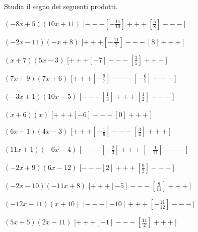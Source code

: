\begin{esercizio}\label{ese:dis_5}
 Studia il segno dei seguenti prodotti.
 \begin{enumeratea}
  \item  $\left(-8 x +5\right)\left(10 x +11\right)$ \hfill 
  [$---\left [-\frac{11}{10} \right ]+++\left [\frac{5}{8} \right ]---$]
  \item  $\left(-2 x -11\right)\left(- x +8\right)$ \hfill 
  [$+++\left [-\frac{11}{2} \right ]---\left [8 \right ]+++$]
  \item  $\left(x +7\right)\left(5 x -3\right)$ \hfill 
  [$+++\left [-7 \right ]---\left [\frac{3}{5} \right ]+++$]
  \item  $\left(7 x +9\right)\left(7 x +6\right)$ \hfill 
  [$+++\left [-\frac{9}{7} \right ]---\left [-\frac{6}{7} \right ]+++$]
  \item  $\left(-3 x +1\right)\left(10 x -5\right)$ \hfill 
  [$---\left [\frac{1}{3} \right ]+++\left [\frac{1}{2} \right ]---$]
  \item  $\left(x +6\right)\left(x \right)$ \hfill 
  [$+++\left [-6 \right ]---\left [0 \right ]+++$]
  \item  $\left(6 x +1\right)\left(4 x -3\right)$ \hfill 
  [$+++\left [-\frac{1}{6} \right ]---\left [\frac{3}{4} \right ]+++$]
  \item  $\left(11 x +1\right)\left(-6 x -4\right)$ \hfill 
  [$---\left [-\frac{2}{3} \right ]+++\left [-\frac{1}{11} \right ]---$]
  \item  $\left(-2 x +9\right)\left(6 x -12\right)$ \hfill 
  [$---\left [2 \right ]+++\left [\frac{9}{2} \right ]---$]
  \item  $\left(-2 x -10\right)\left(-11 x +8\right)$ \hfill 
  [$+++\left [-5 \right ]---\left [\frac{8}{11} \right ]+++$]
  \item  $\left(-12 x -11\right)\left(x +10\right)$ \hfill 
  [$---\left [-10 \right ]+++\left [-\frac{11}{12} \right ]---$]
  \item  $\left(5 x +5\right)\left(2 x -11\right)$ \hfill 
  [$+++\left [-1 \right ]---\left [\frac{11}{2} \right ]+++$]
 \end{enumeratea}
\end{esercizio}

